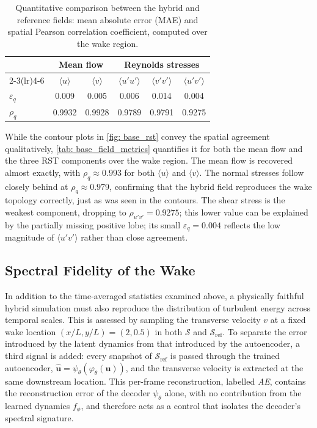\begin{table}[htbp]
  \centering
  
  \begin{tabular}{l cc ccc}
    \toprule
    & \multicolumn{2}{c}{Mean flow} & \multicolumn{3}{c}{Reynolds stresses} \\
    \cmidrule(lr){2-3}\cmidrule(lr){4-6}
    & $\langle u\rangle$ & $\langle v\rangle$
    & $\langle u'u'\rangle$ & $\langle v'v'\rangle$ & $\langle u'v'\rangle$ \\
    \midrule
    $\varepsilon_q$  & 0.009 & 0.005 & 0.006 & 0.014 & 0.004  \\
    $\rho_q$        & 0.9932 & 0.9928 & 0.9789 & 0.9791 & 0.9275 \\
    \bottomrule
  \end{tabular}
    \caption{Quantitative comparison between the hybrid and reference fields: mean absolute error (MAE) and spatial Pearson correlation coefficient, computed over the wake region.}
    \label{tab: base_field_metrics}

\end{table}

While the contour plots in \autoref{fig: base_rst} convey the spatial agreement qualitatively, \autoref{tab: base_field_metrics} quantifies it for both the mean flow and the three RST components over the wake region. The mean flow is recovered almost exactly, with $\rho_q \approx 0.993$ for both $\langle u\rangle$ and $\langle v\rangle$. The normal stresses follow closely behind at $\rho_q \approx 0.979$, confirming that the hybrid field reproduces the wake topology correctly, just as was seen in the contours. The shear stress is the weakest component, dropping to $\rho_{u'v'} = 0.9275$; this lower value can be explained by the partially missing positive lobe; its small $\varepsilon_q = 0.004$ reflects the low magnitude of $\langle u'v'\rangle$ rather than close agreement. 

\subsection{Spectral Fidelity of the Wake}
\label{subsect: 4_physical_consistency}

In addition to the time-averaged statistics examined above, a physically faithful hybrid simulation must also reproduce the distribution of turbulent energy across temporal scales. This is assessed by sampling the transverse velocity $v$ at a fixed wake location $(x/L, y/L) = (2, 0.5)$ in both $\mathcal{S}$ and $\mathcal{S}_\text{ref}$. To separate the error introduced by the latent dynamics from that introduced by the autoencoder, a third signal is added: every snapshot of $\mathcal{S}_\text{ref}$ is passed through the trained autoencoder, $\hat{\mathbf{u}} = \psi_\theta(\varphi_\theta(\mathbf{u}))$, and the transverse velocity is extracted at the same downstream location. This per-frame reconstruction, labelled \emph{AE}, contains the reconstruction error of the decoder $\psi_\theta$ alone, with no contribution from the learned dynamics $f_\phi$, and therefore acts as a control that isolates the decoder's spectral signature.


